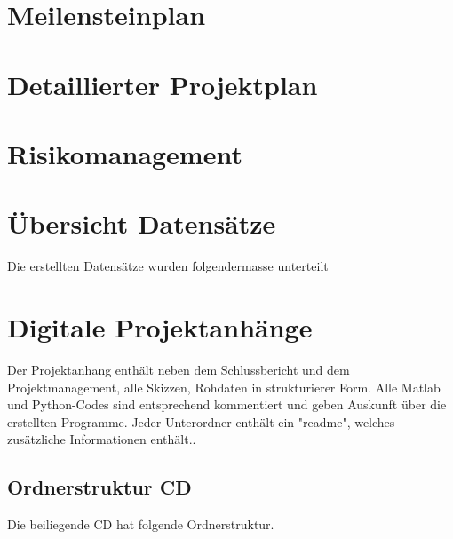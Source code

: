 \appendix

\chapter{Meilensteinplan}
\label{AnhangA}

\chapter{Detaillierter Projektplan}
\label{AnhangB}

\chapter{Risikomanagement}
\label{AnhangC}

\chapter{Übersicht Datensätze }
\label{AnhangD}

Die erstellten Datensätze wurden folgendermasse unterteilt




\chapter{Digitale Projektanhänge}
\label{AnhangE}

Der Projektanhang enthält neben dem Schlussbericht und dem Projektmanagement, alle Skizzen, Rohdaten in strukturierer Form. Alle Matlab und Python-Codes sind entsprechend kommentiert und geben Auskunft über die erstellten Programme. Jeder Unterordner enthält ein "readme", welches zusätzliche Informationen enthält..
\section{Ordnerstruktur CD}


Die beiliegende CD hat folgende Ordnerstruktur.

